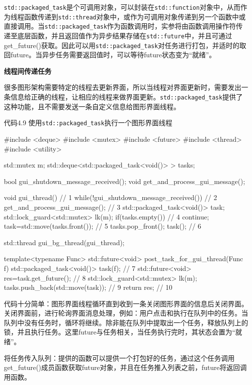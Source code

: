 \texttt{std::packaged\_task}是个可调用对象，可以封装在\texttt{std::function}对象中，从而作为线程函数传递到\texttt{std::thread}对象中，或作为可调用对象传递到另一个函数中或直接调用。当\texttt{std::packaged\_task}作为函数调用时，实参将由函数调用操作符传递至底层函数，并且返回值作为异步结果存储在\texttt{std::future}中，并且可通过get\_future()获取。因此可以用\texttt{std::packaged\_task}对任务进行打包，并适时的取回future。当异步任务需要返回值时，可以等待future状态变为“就绪”。

\textbf{线程间传递任务}

很多图形架构需要特定的线程去更新界面，所以当线程对界面更新时，需要发出一条信息给正确的线程，让相应的线程来做界面更新。\texttt{std::packaged\_task}提供了这种功能，且不需要发送一条自定义信息给图形界面线程。

代码4.9 使用\texttt{std::packaged\_task}执行一个图形界面线程

\begin{cpp}
#include <deque>
#include <mutex>
#include <future>
#include <thread>
#include <utility>

std::mutex m;
std::deque<std::packaged_task<void()> > tasks;

bool gui_shutdown_message_received();
void get_and_process_gui_message();

void gui_thread()  // 1
{
  while(!gui_shutdown_message_received())  // 2
  {
    get_and_process_gui_message();  // 3
    std::packaged_task<void()> task;
    {
      std::lock_guard<std::mutex> lk(m);
      if(tasks.empty())  // 4
        continue;
      task=std::move(tasks.front());  // 5
      tasks.pop_front();
    }
    task();  // 6
  }
}

std::thread gui_bg_thread(gui_thread);

template<typename Func>
std::future<void> post_task_for_gui_thread(Func f)
{
  std::packaged_task<void()> task(f);  // 7
  std::future<void> res=task.get_future();  // 8
  std::lock_guard<std::mutex> lk(m);
  tasks.push_back(std::move(task));  // 9
  return res; // 10
}
\end{cpp}

代码十分简单：图形界面线程循环直到收到一条关闭图形界面的信息后关闭界面。关闭界面前，进行轮询界面消息处理，例如：用户点击和执行在队列中的任务。当队列中没有任务时，循环将继续。除非能在队列中提取出一个任务，释放队列上的锁，并且执行任务。这里future与任务相关，当任务执行完时，其状态会置为“就绪”。

将任务传入队列：提供的函数可以提供一个打包好的任务，通过这个任务调用get\_future()成员函数获取future对象，并且在任务推入列表之前，future将返回调用函数。

